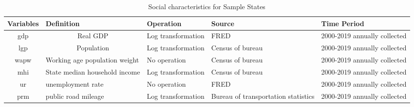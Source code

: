 \clearpage


\begin{table}[H]
    \centering
    \caption{Social characteristics for Sample States}
    \begin{tabular}{cp{6.43em}p{9.285em}p{5.855em}p{5.355em}}
        \toprule
        \multicolumn{1}{p{4em}}{Variables } & Definition                      & Operation          & Source                              & Time Period                  \\
        \midrule
        gdp                                 & \multicolumn{1}{c}{Real GDP}    & Log transformation & FRED                                & 2000-2019 annually collected \\
        \midrule
        lgp                                 & \multicolumn{1}{c}{Population } & Log transformation & Census of bureau                    & 2000-2019 annually collected \\
        \midrule
        wapw                                & Working age population weight   & No operation       & Census of bureau                    & 2000-2019 annually collected \\
        \midrule
        mhi                                 & State median household income   & Log transformation & Census of bureau                    & 2000-2019 annually collected \\
        \midrule
        ur                                  & unemployment rate               & No operation       & FRED                                & 2000-2019 annually collected \\
        \midrule
        prm                                 & public road mileage             & Log transformation & Bureau of transportation statistics & 2000-2019 annually collected \\
        \bottomrule
    \end{tabular}%
    \label{Table 2.4}%
\end{table}%
\clearpage
